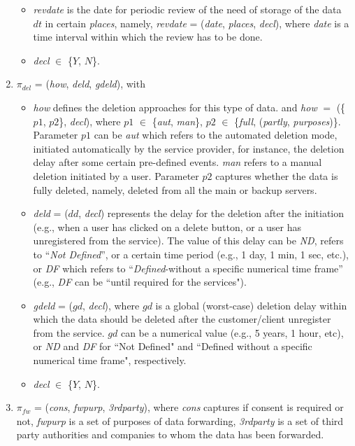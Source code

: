 \documentclass[a4paper]{article}
\begin{document}
\begin{enumerate}
\begin{itemize}
\item \textit{revdate} is the date for periodic review of the need of storage of the data $dt$ in certain \textit{places}, namely, \textit{revdate} = (\textit{date}, \textit{places}, \textit{decl}), where \textit{date} is a time interval within which the review has to be done.  

\item  \textit{decl} $\in$ \{$Y$, $N$\}.
\end{itemize}

\item $\pi_{del}$ = (\textit{how}, \textit{deld},   \textit{gdeld}), with 
\begin{itemize}
\item \textit{how} defines the deletion approaches for this type of data. and \textit{how} $=$ (\{$p1$, $p2$\}, \textit{decl}), where $p1$ $\in$ \{\textit{aut}, \textit{man}\},  $p2$ $\in$ \{\textit{full}, (\textit{partly}, \textit{purposes})\}. Parameter $p1$ can be \textit{aut} which refers to the automated deletion mode, initiated automatically by the service provider, for instance, the deletion delay after some certain pre-defined events. \textit{man} refers to a manual deletion initiated by a user.  Parameter $p2$ captures whether the data is fully deleted, namely, deleted from all the main or backup servers.   

\item \textit{deld} = ($dd$, \textit{decl}) represents the delay for the deletion after the initiation (e.g., when a user 
has clicked on a delete button, or a user has unregistered from the service). The value of this delay can be \textit{ND}, refers to ``\textit{Not Defined}'', or a certain time period (e.g., 1 day, 1 min, 1 sec, etc.), or \textit{DF} which refers to ``\textit{Defined}-without a specific numerical time frame'' (e.g., \textit{DF} can be ``until required for the services").        

\item \textit{gdeld} = ($gd$, \textit{decl}), where $gd$ is a global (worst-case) deletion delay within which the data should be deleted after the customer/client unregister from the service. $gd$ can be a numerical value (e.g., 5 years, 1 hour, etc), or \textit{ND} and \textit{DF} for ``Not Defined" and ``Defined without a specific numerical time frame", respectively.       

\item  \textit{decl} $\in$ \{$Y$, $N$\}. 
\end{itemize}

\item $\pi_{fw}$ = (\textit{cons}, \textit{fwpurp}, \textit{3rdparty}), where \textit{cons} captures if consent is required or not, \textit{fwpurp} is a set of purposes of data forwarding,  \textit{3rdparty} is a set of third party authorities and companies to whom the data has been forwarded.   

\end{enumerate}
\end{document}
